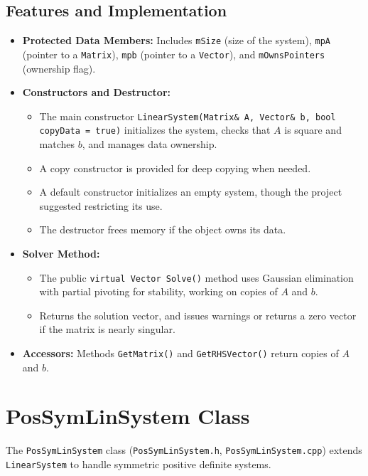 \subsection{Features and Implementation}
\begin{sloppypar}
\begin{itemize}
    \item \textbf{Protected Data Members:} Includes \texttt{mSize} (size of the system), \texttt{mpA} (pointer to a \texttt{Matrix}), \texttt{mpb} (pointer to a \texttt{Vector}), and \texttt{mOwnsPointers} (ownership flag).
    \item \textbf{Constructors and Destructor:}
        \begin{itemize}
            \item The main constructor \texttt{LinearSystem(Matrix\& A, Vector\& b, bool copyData = true)} initializes the system, checks that $A$ is square and matches $b$, and manages data ownership.
            \item A copy constructor is provided for deep copying when needed.
            \item A default constructor initializes an empty system, though the project suggested restricting its use.
            \item The destructor frees memory if the object owns its data.
        \end{itemize}
    \item \textbf{Solver Method:}
        \begin{itemize}
            \item The public \texttt{virtual Vector Solve()} method uses Gaussian elimination with partial pivoting for stability, working on copies of $A$ and $b$.
            \item Returns the solution vector, and issues warnings or returns a zero vector if the matrix is nearly singular.
        \end{itemize}
    \item \textbf{Accessors:} Methods \texttt{GetMatrix()} and \texttt{GetRHSVector()} return copies of $A$ and $b$.
\end{itemize}
\end{sloppypar}

\section{PosSymLinSystem Class}
\label{sec:possymlinSystem_class}

The \texttt{PosSymLinSystem} class (\texttt{PosSymLinSystem.h}, \texttt{PosSymLinSystem.cpp}) extends \texttt{LinearSystem} to handle symmetric positive definite systems.

